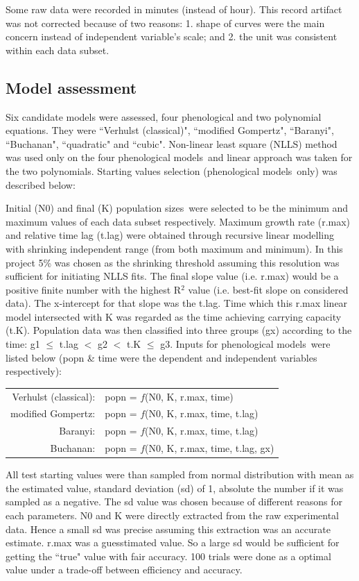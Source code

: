 \documentclass[a4paper, 11pt]{article}
\newcommand{\pms}{phenological models}
\newcommand{\fve}{Verhulst (classical)}
\newcommand{\fgo}{modified Gompertz}
\newcommand{\fba}{Baranyi}
\newcommand{\fbu}{Buchanan}
\newcommand{\fqu}{quadratic}
\newcommand{\fcu}{cubic}
\newcommand{\pps}{population sizes}
\begin{document}
	Some raw data were recorded in minutes (instead of hour).  This record artifact was not corrected because of two reasons: 1. shape of curves were the main concern instead of independent variable's scale; and 2. the unit was consistent within each data subset.
	
	\subsection*{Model assessment}
	Six candidate models were assessed, four phenological and two polynomial equations.  They were ``\fve"\autocite{mckendrick1912xlv}, ``\fgo"\autocite{GIL200689}, ``\fba"\autocite{baranyi1993modeling}, ``\fbu"\autocite{buchanan1993differentiation}, ``\fqu" and ``\fcu". Non-linear least square (NLLS) method was used only on the four \pms\ and linear approach was taken for the two polynomials.  Starting values selection (\pms\ only) was described below:
	
	Initial (N0) and final (K) \pps\ were selected to be the minimum and maximum values of each data subset respectively.  Maximum growth rate (r.max) and relative time lag (t.lag) were obtained through recursive linear modelling with shrinking independent range (from both maximum and minimum).  In this project 5\% was chosen as the shrinking threshold assuming this resolution was sufficient for initiating NLLS fits.  The final slope value (i.e. r.max) would be a positive finite number with the highest R$^{2}$ value (i.e. best-fit slope on considered data).  The x-intercept for that slope was the t.lag.  Time which this r.max linear model intersected with K was regarded as the time achieving carrying capacity (t.K).  Population data was then classified into three groups (gx) according to the time: g1 $\leq$ t.lag $<$ g2 $<$ t.K $\leq$ g3.  Inputs for \pms\ were listed below (popn \& time were the dependent and independent variables respectively):
	
	\begin{tabular}{rl}
		\fve: & popn = $f$(N0, K, r.max, time)\\
		\fgo: & popn = $f$(N0, K, r.max, time, t.lag)\\
		\fba: & popn = $f$(N0, K, r.max, time, t.lag)\\
		\fbu: & popn = $f$(N0, K, r.max, time, t.lag, gx)
	\end{tabular}
	
	All test starting values were than sampled from normal distribution with mean as the estimated value, standard deviation (sd) of 1, absolute the number if it was sampled as a negative.  The sd value was chosen because of different reasons for each parameters.  N0 and K were directly extracted from the raw experimental data.  Hence a small sd was precise assuming this extraction was an accurate estimate. r.max was a guesstimated value.  So a large sd would be sufficient for getting the ``true" value with fair accuracy.  100 trials were done as a optimal value under a trade-off between efficiency and accuracy.
	
\end{document}
